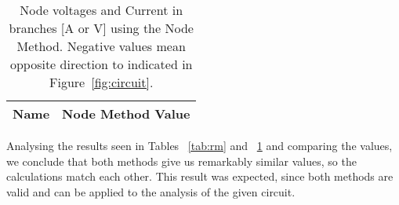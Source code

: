 \begin{table}[h]
  \centering
  \begin{tabular}{|l|r|}
    \hline    
    {\bf Name} & {\bf Node Method Value}\\ \hline
    
  \end{tabular}
  \caption{Node voltages and Current in branches [A or V] using the Node Method. Negative values mean opposite direction to indicated in Figure~\ref{fig:circuit}.}
  \label{tab:rn}
\end{table}


Analysing the results seen in Tables ~\ref{tab:rm} and ~\ref{tab:rn}  and comparing the values, we conclude that both methods give us remarkably similar values, so the calculations match each other. This result was expected, since both methods are valid and can be applied to the analysis of the given circuit. 










